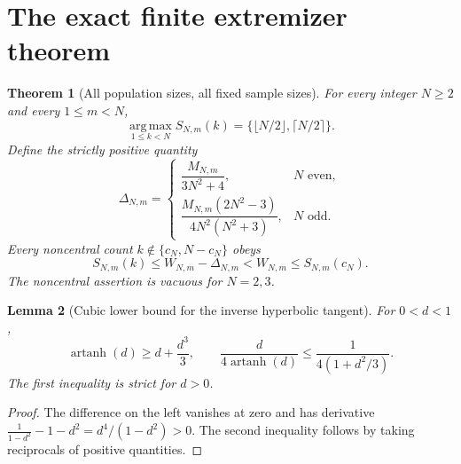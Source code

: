 \documentclass[11pt]{article}
\numberwithin{equation}{section}
\newtheorem{theorem}{Theorem}[section]
\newtheorem{lemma}[theorem]{Lemma}
\theoremstyle{remark}\newtheorem{remark}[theorem]{Remark}
\newcommand{\artanh}{\operatorname{artanh}}
\newcommand{\argmax}{\operatorname*{arg\,max}}
\begin{document}
\section{The exact finite extremizer theorem}
\begin{theorem}[All population sizes, all fixed sample sizes]\label{main}
For every integer $N\ge2$ and every $1\le m<N$,
\begin{equation}\label{argmax}
\argmax_{1\le k<N}S_{N,m}(k)
=\{\lfloor N/2\rfloor,\lceil N/2\rceil\}.
\end{equation}
Define the strictly positive quantity
\begin{equation}\label{delta}
\Delta_{N,m}=
\begin{cases}
\dfrac{M_{N,m}}{3N^2+4},& N\text{ even},\\[6pt]
\dfrac{M_{N,m}(2N^2-3)}{4N^2(N^2+3)},& N\text{ odd}.
\end{cases}
\end{equation}
Every noncentral count $k\notin\{c_N,N-c_N\}$ obeys
\begin{equation}\label{strict}
S_{N,m}(k)\le W_{N,m}-\Delta_{N,m}
<W_{N,m}\le S_{N,m}(c_N).
\end{equation}
The noncentral assertion is vacuous for $N=2,3$.
\end{theorem}

\begin{lemma}[Cubic lower bound for the inverse hyperbolic tangent]\label{atanh}
For $0<d<1$,
\begin{equation}\label{Bdeficit}
\artanh(d)\ge d+\frac{d^3}{3},\qquad
\frac{d}{4\artanh(d)}
\le\frac{1}{4(1+d^2/3)}.
\end{equation}
The first inequality is strict for $d>0$.
\end{lemma}
\begin{proof}
The difference on the left vanishes at zero and has derivative
$\frac{1}{1-d^2}-1-d^2=d^4/(1-d^2)>0$.
The second inequality follows by taking reciprocals of positive quantities.
\end{proof}
\end{document}
